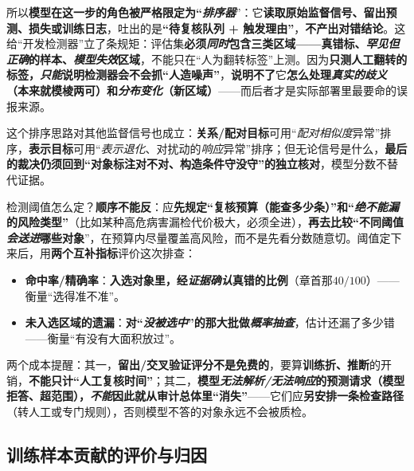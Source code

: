 所以\textbf{模型在这一步的角色被严格限定为“\emph{排序器}}”：它\textbf{读取原始监督信号、留出预测、损失或训练日志}，吐出的是\textbf{“待复核队列 + 触发理由”}，\textbf{不产出对错结论}。这给“开发检测器”立了条规矩：评估集\textbf{必须\emph{同时}包含三类区域——真错标、\emph{罕见但正确}的样本、\emph{模型失效}区域}，不能只在“人为翻转标签”上测。因为\textbf{只测人工翻转的标签，\emph{只能}说明检测器会不会抓“人造噪声”}，\textbf{说明不了}它\textbf{怎么处理\emph{真实的歧义}（本来就模棱两可）和\emph{分布变化}（新区域）}——而后者才是实际部署里最要命的误报来源。

这个排序思路对其他监督信号也成立：\textbf{关系/配对目标}可用“\emph{配对相似度}异常”排序，\textbf{表示目标}可用“\emph{表示退化}、对扰动的\emph{响应}异常”排序；但无论信号是什么，\textbf{最后的裁决仍须回到“对象标注对不对、构造条件守没守”的独立核对}，模型分数不替代证据。

检测阈值怎么定？\textbf{顺序不能反}：应\textbf{先规定“复核预算（能查多少条）”和“\emph{绝不能漏}的风险类型”}（比如某种高危病害漏检代价极大，必须全进），\textbf{再去比较“不同阈值\emph{会送进}哪些对象}”，在预算内尽量覆盖高风险，而不是先看分数随意切。阈值定下来后，用\textbf{两个互补指标}评价这次排查：
\begin{itemize}\item \textbf{命中率/精确率}：\textbf{入选对象里，经\emph{证据确认}真错的比例}（章首那$40/100$）——衡量“选得准不准”。\item \textbf{未入选区域的遗漏}：\textbf{对“\emph{没被选中}”的那大批做\emph{概率抽查}}，估计还漏了多少错——衡量“有没有大面积放过”。\end{itemize}
两个成本提醒：其一，\textbf{留出/交叉验证评分不是免费的}，要算\textbf{训练折、推断}的开销，\textbf{不能只计“人工复核时间”}；其二，\textbf{模型\emph{无法解析/无法响应}的预测请求（模型拒答、超范围），\emph{不能}因此就从审计总体里“消失”}——它们应\textbf{另安排一条检查路径}（转人工或专门规则），否则模型不答的对象永远不会被质检。

\subsection{训练样本贡献的评价与归因}
\label{sec:ka-sample-valuation}

